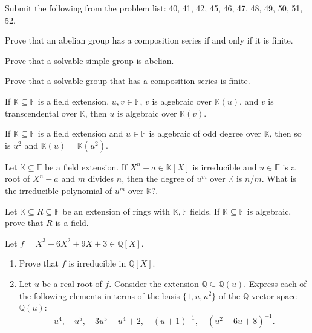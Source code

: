 \documentclass[addpoints,10pt]{exam}
\theoremstyle{plain}
\theoremstyle{definition}
\newtheorem{prob}[thm]{Problem}
\theoremstyle{plain}
\theoremstyle{plain}
\theoremstyle{definition}
\let\oldprob\prob
\let\endoldprob\endprob
\renewenvironment{prob}
  {\begin{singlespace}\oldprob}
  {\endoldprob\end{singlespace}}
\newcommand{\FF}{\ensuremath{\mathbb{F}}}
\newcommand{\KK}{\ensuremath{\mathbb{K}}}
\begin{document}
Submit the following from the problem list: 40, 41, 42, 45, 46, 47, 48, 49, 50, 51, 52.
\setcounter{thm}{39}   %
\begin{prob}
Prove that an abelian group has a composition series if and only if it is finite.
\end{prob}
\newpage
\begin{prob}
Prove that a solvable simple group is abelian.
\end{prob}
\newpage
\begin{prob}
Prove that a solvable group that has a composition series is finite.
\end{prob}
\newpage
\setcounter{thm}{44}   %
\begin{prob}
If $\KK\subseteq \FF$ is a field extension, $u,v\in \FF$, $v$ is algebraic over $\KK(u)$, and $v$ is transcendental over $\KK$, then $u$ is algebraic over $\KK(v)$.
\end{prob}
\newpage
\begin{prob}
If $\KK\subseteq \FF$ is a field extension and $u\in \FF$ is algebraic of odd degree over $\KK$, then so is $u^{2}$ and $\KK(u)=\KK(u^{2})$. 
\end{prob}
\newpage
\begin{prob}
Let $\KK \subseteq \FF$ be a field extension. If $X^n - a \in \KK[X]$ is irreducible and $u \in \FF$ is a root of $X^n - a$ and $m$ divides $n$, then the degree of $u^m$ over $\KK$ is $n/m$. What is the irreducible polynomial of $u^m$ over $\KK$?.
\end{prob}
\newpage
\begin{prob}
Let $\KK \subseteq R \subseteq \FF$ be an extension of rings with $\KK,\FF$ fields. If $\KK \subseteq \FF$ is algebraic, prove that $R$ is a field.
\end{prob}
\newpage
\begin{prob}
Let $f = X^3 - 6X^2 + 9X + 3 \in \mathbb{Q}[X]$.
\begin{enumerate}[label=(\alph*)]
\item Prove that $f$ is irreducible in $\mathbb{Q}[X]$.
\item Let $u$ be a real root of $f$. Consider the extension $\mathbb{Q} \subseteq \mathbb{Q}(u)$. Express each of the following elements in terms of the basis $\{1,u,u^2\}$ of the $\mathbb{Q}$-vector space $\mathbb{Q}(u)$:
\[
u^4,\quad u^5,\quad 3u^5 - u^4 + 2,\quad (u+1)^{-1},\quad (u^2 - 6u + 8)^{-1}.
\]
\end{enumerate}
\end{prob}
\end{document}
